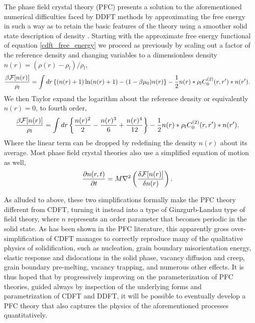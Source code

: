 The phase field crystal theory (PFC) presents a solution to the aforementioned
numerical difficulties faced by DDFT methods by approximating the free energy
in such a way as to retain the basic features of the theory using a smoother
solid state description of density . Starting with the approximate free energy
functional of equation \ref{cdft_free_energy} we proceed as previously by
scaling out a factor of the reference density and changing variables to a
dimensionless density $n(r) = (\rho(r) - \rho_l) / \rho_l$,
%
\begin{equation}
    \frac{\beta \mathcal{F}[n(r)]}{\rho_l} = 
        \int dr \left\lbrace (n(r) + 1) \ln( n(r) + 1) - (1 - \beta\mu_0)n(r) \right\rbrace
        - \frac{1}{2} n(r) \ast \rho_l C^{(2)}_0(r, r^\prime) \ast n(r^\prime).
\end{equation}
%
We then Taylor expand the logarithm about the reference density or equivalently
$n(r) = 0$, to fourth order,
%
\begin{equation}
    \label{pfc_free_energy} 
    \frac{\beta \mathcal{F}[n(r)]}{\rho_l} =
        \int dr \left\lbrace \frac{n(r)^2}{2} - \frac{n(r)^3}{6} + \frac{n(r)^4}{12} \right\rbrace
        -\frac{1}{2} n(r) \ast \rho_l C^{(2)}_0(r, r^\prime) \ast n(r^\prime).
\end{equation}
%
Where the linear term can be dropped by redefining the density $n(r)$ about its
average. Most phase field crystal theories also use a simplified equation of
motion as well,
%
\begin{equation}
    \label{pfc_eom}
    \frac{\partial n(r, t)}{\partial t} = M \nabla^2 \left(\frac{\delta \mathcal{F}[n(r)]}{\delta n(r)}\right).
\end{equation}
%

As alluded to above, these two simplifications formally make the PFC theory
different from CDFT, turning it instead into a type of Ginzgurb-Landau type of
field theory, where $n$ represents an order parameter that becomes periodic in
the solid state. As has been shown in the PFC literature, this apparently gross
over-simplification of CDFT manages to correctly reproduce many of the
qualitative physics of solidification, such as nucleation, grain boundary
misorientation energy, elastic response and dislocations in the solid phase,
vacancy diffusion and creep, grain boundary pre-melting, vacancy trapping, and
numerous other effects. It is thus hoped that by progressively improving on the
parameterization of  PFC theories, guided always by inspection of the
underlying  forms and parametrization of CDFT and DDFT, it will be possible to
eventually develop a PFC theory that also captures the physics of the
aforementioned processes quantitatively.

